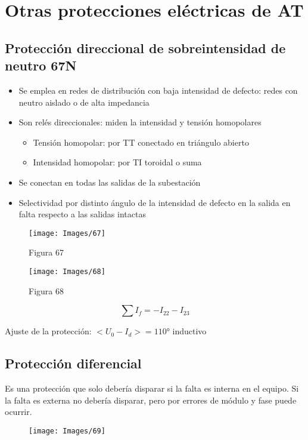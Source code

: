 \chapter{Otras protecciones eléctricas de AT}
\section{Protección direccional de sobreintensidad de neutro 67N}
\begin{itemize}
	\item Se emplea en redes de distribución con baja intensidad de defecto:
	redes con neutro aislado o de alta impedancia
	\item Son relés direccionales: miden la intensidad y tensión homopolares
	\begin{itemize}
		\item Tensión homopolar: por TT conectado en triángulo abierto
		\item Intensidad homopolar: por TI toroidal o suma
	\end{itemize}
	\item Se conectan en todas las salidas de la subestación
	\item Selectividad por distinto ángulo de la intensidad de defecto en la
	salida en falta respecto a las salidas intactas
\end{itemize}

\begin{figure}[H]
	\centering
	\begin{minipage}[b]{0.45\linewidth} %
		\centering
		\texttt{[image: Images/67]}
		\caption{Figura 67}
		\label{fig:67}
	\end{minipage}
	\hspace{0.05\linewidth} %
	\begin{minipage}[b]{0.45\linewidth} %
		\centering
		\texttt{[image: Images/68]}
		\caption{Figura 68}
		\label{fig:68}
	\end{minipage}
\end{figure}
\begin{equation}
	\sum I_f=-I_22-I_23
\end{equation}

Ajuste de la protección: $< U_0 - I_d > = \ang{110}$ inductivo
\section{Protección diferencial}
Es una protección que solo debería disparar si la falta es interna en el equipo. Si la falta es externa no debería disparar, pero por errores de módulo y fase puede ocurrir.
\begin{figure}[H]
	\centering
	\texttt{[image: Images/69]}
	\label{fig:69}
\end{figure}

